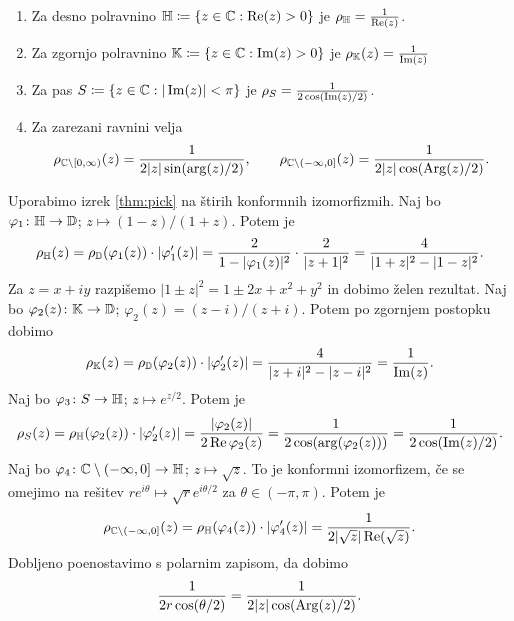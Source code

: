 \begin{trditev} \label{prop:hypexamples} \mbox{}
    \begin{enumerate}
        \item Za desno polravnino \(\mathbb H \coloneq \left\{  z \in \mathbb C : \operatorname{Re} (z) > 0  \right\}\) je \(\rho_\mathbb H = \frac{1}{\operatorname{Re} (z)}\).
        \item Za zgornjo polravnino \(\mathbb K \coloneq \left\{ z \in \mathbb C : \operatorname{Im} (z) > 0 \right\}\) je \(\rho_{\mathbb K} (z) = \frac{1}{\operatorname{Im} (z)}\)
        \item Za pas \(S \coloneq \left\{ z \in \mathbb C : |\operatorname{Im} (z)| < \pi \right\}\) je \(\rho_{S} = \frac{1}{2 \cos (\operatorname{Im} (z) / 2)}\).
        \item Za zarezani ravnini velja
              \[
                  \rho_{\mathbb C \setminus [0, \infty)} (z) = \frac{1}{2 |z| \sin (\arg (z) / 2)},
                  \qquad
                  \rho_{\mathbb C \setminus (-\infty, 0]} (z) = \frac{1}{2 |z| \cos (\operatorname{Arg} (z) / 2)}.
              \]
    \end{enumerate}
\end{trditev}

\begin{dokaz}
    Uporabimo izrek \ref{thm:pick} na štirih konformnih izomorfizmih. Naj bo \(\varphi_1 \colon \mathbb H \to \mathbb D\); \(z \mapsto (1 - z) / (1 + z)\). Potem je
    \[\rho_{\mathbb H} (z) = \rho_{\mathbb D} (\varphi_1 (z)) \cdot \left\lvert\varphi_1' (z)\right\rvert = \frac{2}{1 - |\varphi_1 (z)|^2} \cdot \frac{2}{|z + 1|^2} = \frac{4}{|1 + z|^2 - |1- z|^2}.\]
    Za \(z = x + i y\) razpišemo \(|1 \pm z|^2 = 1 \pm 2x + x^2 + y^2\) in dobimo želen rezultat. Naj bo \(\varphi_2 (z) \colon \mathbb K \to \mathbb D\); \(\varphi_2 (z) = (z - i) / (z + i)\). Potem po zgornjem postopku dobimo
    \[\rho_{\mathbb K} (z) = \rho_{\mathbb D} (\varphi_2 (z)) \cdot \left\lvert\varphi_2' (z)\right\rvert = \frac{4}{|z + i|^2 - |z - i|^2} = \frac{1}{\operatorname{Im} (z)}.\]
    Naj bo \(\varphi_3 \colon S \to \mathbb H\); \(z \mapsto e^{z / 2}\). Potem je
    \[\rho_S (z) = \rho_{\mathbb H} (\varphi_2 (z)) \cdot |\varphi_2' (z)| = \frac{|\varphi_2 (z)|}{2 \operatorname{Re} \varphi_2 (z)} = \frac{1}{2 \cos (\arg (\varphi_2 (z)))} = \frac{1}{2 \cos (\operatorname{Im} (z) / 2)}.\]
    Naj bo \(\varphi_4 \colon \mathbb C \setminus (- \infty, 0] \to \mathbb H\); \(z \mapsto \sqrt{z}\). To je konformni izomorfizem, če se omejimo na rešitev \(r e^{i \theta} \mapsto \sqrt{r} e^{i \theta / 2}\) za \(\theta \in (- \pi, \pi)\). Potem je
    \[\rho_{\mathbb C \setminus (- \infty, 0]} (z) = \rho_{\mathbb H} (\varphi_4 (z)) \cdot |\varphi_4' (z)| = \frac{1}{2 |\sqrt{z}| \operatorname{Re} (\sqrt{z})}.\]
    Dobljeno poenostavimo s polarnim zapisom, da dobimo
    \[\frac{1}{2 r \cos (\theta / 2)} = \frac{1}{2 |z| \cos (\operatorname{Arg} (z) / 2)}.\]
\end{dokaz}
